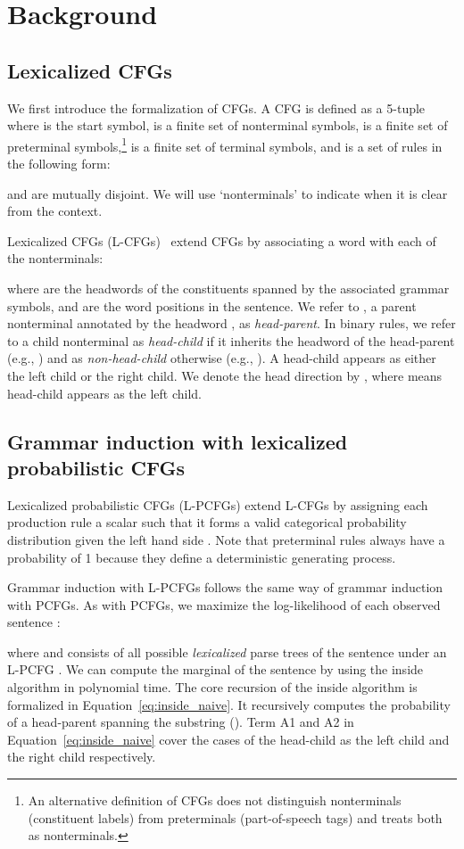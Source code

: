 \documentclass[11pt,a4paper]{article}
\begin{document}
\section{Background}
\subsection{Lexicalized CFGs}
We first introduce the formalization of CFGs.
A CFG is defined as a 5-tuple  where  is the start symbol,  is a finite set of nonterminal symbols,  is a finite set of preterminal symbols,\footnote{An alternative definition of CFGs does not distinguish nonterminals  (constituent labels) from preterminals  (part-of-speech tags) and treats both as nonterminals.} 
 is a finite set of terminal symbols, and  is a set of rules in the following form:

 and  are mutually disjoint.
We will use `nonterminals' to indicate  when it is clear from the context.

Lexicalized CFGs (L-CFGs)~\citep{collins-2003-head} extend CFGs by associating a word with each of the nonterminals:

where  are the headwords of the constituents spanned by the associated grammar symbols, and  are the word positions in the sentence.
We refer to , a parent nonterminal annotated by the headword , as \emph{head-parent}.
In binary rules, we refer to a child nonterminal as \emph{head-child} if it inherits the headword of the head-parent (e.g., ) and as \emph{non-head-child} otherwise  (e.g., ).
A head-child appears as either the left child or the right child.
We denote the head direction by , where  means head-child appears as the left child.


\subsection{Grammar induction with lexicalized probabilistic CFGs}

Lexicalized probabilistic CFGs (L-PCFGs) extend L-CFGs by assigning each production rule  a scalar  such that it forms a valid categorical probability distribution given the left hand side .
Note that preterminal rules always have a probability of 1 because they define a deterministic generating process.

Grammar induction with L-PCFGs follows the same way of grammar induction with PCFGs.
As with PCFGs, we maximize the log-likelihood of each observed sentence :

where  and  consists of all possible \emph{lexicalized} parse trees of the sentence  under an L-PCFG .
We can compute the marginal  of the sentence by using the inside algorithm in polynomial time.
The core recursion of the inside algorithm is formalized in Equation~\ref{eq:inside_naive}.
It recursively computes the probability  of a head-parent  spanning the substring  ().
Term A1 and A2 in Equation~\ref{eq:inside_naive} cover the cases of the head-child as the left child and the right child respectively.
\end{document}
